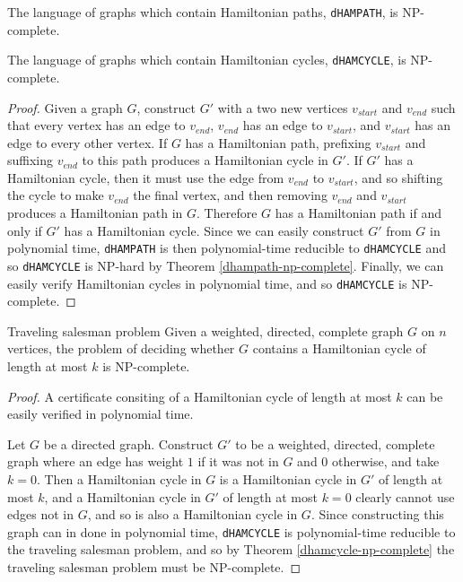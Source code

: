 \begin{thm}\label{dhampath-np-complete}
    The language of graphs which contain Hamiltonian paths, \verb|dHAMPATH|, is NP-complete.
\end{thm}

\begin{thm}\label{dhamcycle-np-complete}
    The language of graphs which contain Hamiltonian cycles, \verb|dHAMCYCLE|, is NP-complete.
\end{thm}

\begin{proof}
    Given a graph $G$, construct $G'$ with a two new vertices $v_{start}$ and $v_{end}$ such that every vertex has an edge to $v_{end}$, $v_{end}$ has an edge to $v_{start}$, and $v_{start}$ has an edge to every other vertex. If $G$ has a Hamiltonian path, prefixing $v_{start}$ and suffixing $v_{end}$ to this path produces a Hamiltonian cycle in $G'$. If $G'$ has a Hamiltonian cycle, then it must use the edge from $v_{end}$ to $v_{start}$, and so shifting the cycle to make $v_{end}$ the final vertex, and then removing $v_{end}$ and $v_{start}$ produces a Hamiltonian path in $G$. Therefore $G$ has a Hamiltonian path if and only if $G'$ has a Hamiltonian cycle. Since we can easily construct $G'$ from $G$ in polynomial time, \verb|dHAMPATH| is then polynomial-time reducible to \verb|dHAMCYCLE| and so \verb|dHAMCYCLE| is NP-hard by Theorem \ref{dhampath-np-complete}. Finally, we can easily verify Hamiltonian cycles in polynomial time, and so \verb|dHAMCYCLE| is NP-complete.
\end{proof}

\begin{thm}{Traveling salesman problem}\proofbreak
    Given a weighted, directed, complete graph $G$ on $n$ vertices, the problem of deciding whether $G$ contains a Hamiltonian cycle of length at most $k$ is NP-complete.
\end{thm}

\begin{proof}
    A certificate consiting of a Hamiltonian cycle of length at most $k$ can be easily verified in polynomial time.

    Let $G$ be a directed graph. Construct $G'$ to be a weighted, directed, complete graph where an edge has weight $1$ if it was not in $G$ and $0$ otherwise, and take $k = 0$. Then a Hamiltonian cycle in $G$ is a Hamiltonian cycle in $G'$ of length at most $k$, and a Hamiltonian cycle in $G'$ of length at most $k=0$ clearly cannot use edges not in $G$, and so is also a Hamiltonian cycle in $G$. Since constructing this graph can in done in polynomial time, \verb|dHAMCYCLE| is polynomial-time reducible to the traveling salesman problem, and so by Theorem \ref{dhamcycle-np-complete} the traveling salesman problem must be NP-complete.
\end{proof}

